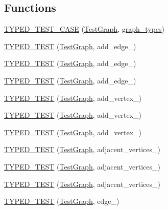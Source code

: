 \subsection*{Functions}
\begin{DoxyCompactItemize}
\item 
\hyperlink{TestGraph_8c_09_09_a93499b72b807dd804b034251e923d425}{T\-Y\-P\-E\-D\-\_\-\-T\-E\-S\-T\-\_\-\-C\-A\-S\-E} (\hyperlink{structTestGraph}{Test\-Graph}, \hyperlink{TestGraph_8c_09_09_ab8e2ae2a7026aca598606c55b1494184}{graph\-\_\-types})
\item 
\hyperlink{TestGraph_8c_09_09_a846fbbada4644eb5ed8aad1d8c66ac1d}{T\-Y\-P\-E\-D\-\_\-\-T\-E\-S\-T} (\hyperlink{structTestGraph}{Test\-Graph}, add\-\_\-edge\-\_)
\item 
\hyperlink{TestGraph_8c_09_09_ae6995b22e45418716483ede892d6409d}{T\-Y\-P\-E\-D\-\_\-\-T\-E\-S\-T} (\hyperlink{structTestGraph}{Test\-Graph}, add\-\_\-edge\-\_)
\item 
\hyperlink{TestGraph_8c_09_09_adef122e25bb2d21a272bff56bd75ece3}{T\-Y\-P\-E\-D\-\_\-\-T\-E\-S\-T} (\hyperlink{structTestGraph}{Test\-Graph}, add\-\_\-edge\-\_)
\item 
\hyperlink{TestGraph_8c_09_09_aa62185520e0cce0f3bcfecdac81f00f8}{T\-Y\-P\-E\-D\-\_\-\-T\-E\-S\-T} (\hyperlink{structTestGraph}{Test\-Graph}, add\-\_\-vertex\-\_)
\item 
\hyperlink{TestGraph_8c_09_09_a5730ee3afd8d1a4036569b96b739eebe}{T\-Y\-P\-E\-D\-\_\-\-T\-E\-S\-T} (\hyperlink{structTestGraph}{Test\-Graph}, add\-\_\-vertex\-\_)
\item 
\hyperlink{TestGraph_8c_09_09_a067dd8799211220c6fd63e53b63c6545}{T\-Y\-P\-E\-D\-\_\-\-T\-E\-S\-T} (\hyperlink{structTestGraph}{Test\-Graph}, add\-\_\-vertex\-\_)
\item 
\hyperlink{TestGraph_8c_09_09_a4f145c2f2e3fe8f99d0ab9f6d16839c5}{T\-Y\-P\-E\-D\-\_\-\-T\-E\-S\-T} (\hyperlink{structTestGraph}{Test\-Graph}, adjacent\-\_\-vertices\-\_)
\item 
\hyperlink{TestGraph_8c_09_09_a098fdd8ff786d99b9f1e8d8bbf48cb01}{T\-Y\-P\-E\-D\-\_\-\-T\-E\-S\-T} (\hyperlink{structTestGraph}{Test\-Graph}, adjacent\-\_\-vertices\-\_)
\item 
\hyperlink{TestGraph_8c_09_09_a8a08b08a003dc2c400c7ed1202bc9c79}{T\-Y\-P\-E\-D\-\_\-\-T\-E\-S\-T} (\hyperlink{structTestGraph}{Test\-Graph}, adjacent\-\_\-vertices\-\_)
\item 
\hyperlink{TestGraph_8c_09_09_a652498d7062532c4a8c78ed9c91b22f0}{T\-Y\-P\-E\-D\-\_\-\-T\-E\-S\-T} (\hyperlink{structTestGraph}{Test\-Graph}, edge\-\_)

\end{DoxyCompactItemize}
